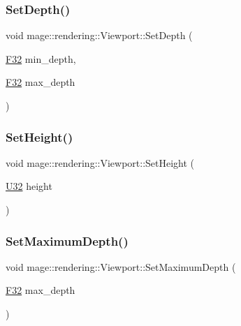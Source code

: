 \hypertarget{classmage_1_1rendering_1_1_viewport_a6e6edb1bb4f538b0639e42a00005c34e}{}\label{classmage_1_1rendering_1_1_viewport_a6e6edb1bb4f538b0639e42a00005c34e} 
\subsubsection{\texorpdfstring{Set\+Depth()}{SetDepth()}}
{\footnotesize\ttfamily void mage\+::rendering\+::\+Viewport\+::\+Set\+Depth (\begin{DoxyParamCaption}\item[{\hyperlink{namespacemage_aa97e833b45f06d60a0a9c4fc22ae02c0}{F32}}]{min\+\_\+depth,  }\item[{\hyperlink{namespacemage_aa97e833b45f06d60a0a9c4fc22ae02c0}{F32}}]{max\+\_\+depth }\end{DoxyParamCaption})\hspace{0.3cm}{\ttfamily [noexcept]}}

\hypertarget{classmage_1_1rendering_1_1_viewport_aeec860b52dc9b3b703935ff94e2a3c47}{}\label{classmage_1_1rendering_1_1_viewport_aeec860b52dc9b3b703935ff94e2a3c47} 
\subsubsection{\texorpdfstring{Set\+Height()}{SetHeight()}}
{\footnotesize\ttfamily void mage\+::rendering\+::\+Viewport\+::\+Set\+Height (\begin{DoxyParamCaption}\item[{\hyperlink{namespacemage_a41c104c036fba3756a74e19f793eeaa1}{U32}}]{height }\end{DoxyParamCaption})\hspace{0.3cm}{\ttfamily [noexcept]}}

\hypertarget{classmage_1_1rendering_1_1_viewport_ab96df600f62ff91a4d073f2c51b5e95e}{}\label{classmage_1_1rendering_1_1_viewport_ab96df600f62ff91a4d073f2c51b5e95e} 
\subsubsection{\texorpdfstring{Set\+Maximum\+Depth()}{SetMaximumDepth()}}
{\footnotesize\ttfamily void mage\+::rendering\+::\+Viewport\+::\+Set\+Maximum\+Depth (\begin{DoxyParamCaption}\item[{\hyperlink{namespacemage_aa97e833b45f06d60a0a9c4fc22ae02c0}{F32}}]{max\+\_\+depth }\end{DoxyParamCaption})\hspace{0.3cm}{\ttfamily [noexcept]}}

